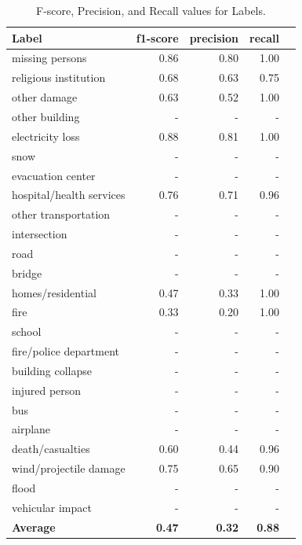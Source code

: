 \documentclass{article}
\begin{document}
\begin{table}
\centering
\small
\begin{tabular}{|l|r|r|r| p{8cm} |}
\hline
{\bf Label}  & {\bf f1-score} & {\bf precision} & {\bf recall} \\
\hline
missing persons &  0.86  & 0.80       &  1.00 \\
religious institution          &  0.68  &    0.63    &  0.75\\
other damage        &  0.63  & 0.52   &  1.00\\
other building        &  - & -  &  -\\
electricity loss     & 0.88 & 0.81   &  1.00\\
snow        & - & - & - \\
evacuation center    &  - &  -   &  - \\
hospital/health services & 0.76 & 0.71 & 0.96 \\
other transportation & - & - & - \\
intersection & - & - & - \\
road        & - & - & - \\
bridge       & - & - &  -\\
homes/residential    & 0.47 & 0.33 &  1.00\\
fire & 0.33 & 0.20 & 1.00 \\
school & - & - & - \\
fire/police department & - & - & - \\
building collapse        & - & - & - \\
injured person & - & - & - \\
bus & -   &  -    &  -\\
airplane & -  &  -  &  -\\
death/casualties & 0.60  &  0.44  &  0.96\\
wind/projectile damage & 0.75  &  0.65   &  0.90\\
flood & -   &  -  &  -\\
vehicular impact & -   &  -    &  -\\
\hline
{\bf Average}  & {\bf 0.47} & {\bf 0.32}  & {\bf 0.88}  \\
\hline
\end{tabular}
\label{tab.by_label}
\caption{F-score, Precision, and Recall values for Labels.}
\end{table}
\end{document}
